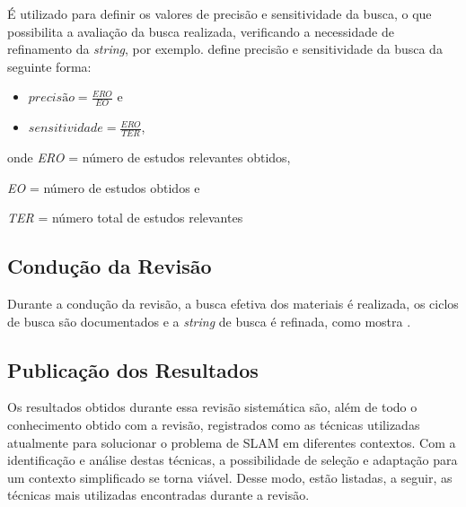 			É utilizado para definir os valores de precisão e sensitividade da busca, o que possibilita a avaliação da busca realizada, verificando a necessidade de refinamento da \textit{string}, por exemplo. \cite{quasi_goldES} define precisão e sensitividade da busca da seguinte forma:

			\begin{itemize}

				\item $precisão = \frac{ERO}{EO}$ e

				\item $sensitividade = \frac{ERO}{TER}$,
			\end{itemize}
			
			onde \textit{ERO} = número de estudos relevantes obtidos,
			
			\textit{EO} = número de estudos obtidos e

			\textit{TER} = número total de estudos relevantes

		

	\subsection{Condução da Revisão} %
	\label{sub:conducaoRevisao}
		
		Durante a condução da revisão, a busca efetiva dos materiais é realizada, os ciclos de busca são documentados e a \textit{string} de busca é refinada, como mostra \cite{estudoPrimarioSecundario}.

	\subsection{Publicação dos Resultados} %
	\label{sub:publicacaoRevisao}
		
		Os resultados obtidos durante essa revisão sistemática são, além de todo o conhecimento obtido com a revisão, registrados como as técnicas utilizadas atualmente para solucionar o problema de SLAM em diferentes contextos. Com a identificação e análise destas técnicas, a possibilidade de seleção e adaptação para um contexto simplificado se torna viável. Desse modo, estão listadas, a seguir, as técnicas mais utilizadas encontradas durante a revisão.




